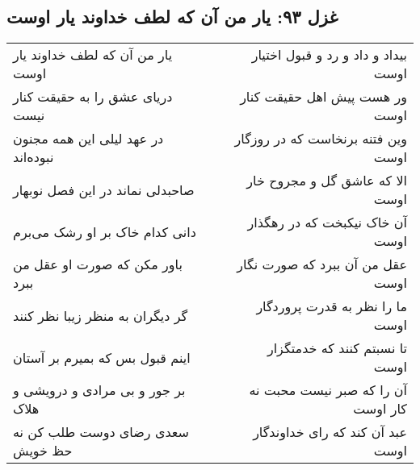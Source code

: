 \begin{center}
\section*{غزل ۹۳: یار من آن که لطف خداوند یار اوست}
\label{sec:093}
\begin{longtable}{l p{0.5cm} r}
یار من آن که لطف خداوند یار اوست
&&
بیداد و داد و رد و قبول اختیار اوست
\\
دریای عشق را به حقیقت کنار نیست
&&
ور هست پیش اهل حقیقت کنار اوست
\\
در عهد لیلی این همه مجنون نبوده‌اند
&&
وین فتنه برنخاست که در روزگار اوست
\\
صاحبدلی نماند در این فصل نوبهار
&&
الا که عاشق گل و مجروح خار اوست
\\
دانی کدام خاک بر او رشک می‌برم
&&
آن خاک نیکبخت که در رهگذار اوست
\\
باور مکن که صورت او عقل من ببرد
&&
عقل من آن ببرد که صورت نگار اوست
\\
گر دیگران به منظر زیبا نظر کنند
&&
ما را نظر به قدرت پروردگار اوست
\\
اینم قبول بس که بمیرم بر آستان
&&
تا نسبتم کنند که خدمتگزار اوست
\\
بر جور و بی مرادی و درویشی و هلاک
&&
آن را که صبر نیست محبت نه کار اوست
\\
سعدی رضای دوست طلب کن نه حظ خویش
&&
عبد آن کند که رای خداوندگار اوست
\\
\end{longtable}
\end{center}
